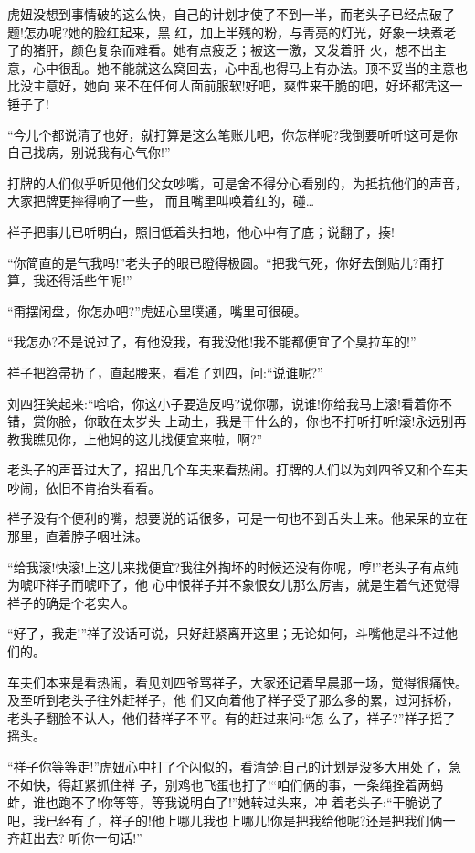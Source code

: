 \documentclass[11pt,a4paper,onecolumn]{article}
\begin{document}
虎妞没想到事情破的这么快，自己的计划才使了不到一半，而老头子已经点破了题!怎办呢?她的脸红起来，黑
红，加上半残的粉，与青亮的灯光，好象一块煮老了的猪肝，颜色复杂而难看。她有点疲乏；被这一激，又发着肝
火，想不出主意，心中很乱。她不能就这么窝回去，心中乱也得马上有办法。顶不妥当的主意也比没主意好，她向
来不在任何人面前服软!好吧，爽性来干脆的吧，好坏都凭这一锤子了!

``今儿个都说清了也好，就打算是这么笔账儿吧，你怎样呢?我倒要听听!这可是你自己找病，别说我有心气你!''

打牌的人们似乎听见他们父女吵嘴，可是舍不得分心看别的，为抵抗他们的声音，大家把牌更摔得响了一些，
而且嘴里叫唤着红的，碰\ldots 

祥子把事儿已听明白，照旧低着头扫地，他心中有了底；说翻了，揍!

``你简直的是气我吗!''老头子的眼已瞪得极圆。``把我气死，你好去倒贴儿?甭打算，我还得活些年呢!''

``甭摆闲盘，你怎办吧?''虎妞心里噗通，嘴里可很硬。

``我怎办?不是说过了，有他没我，有我没他!我不能都便宜了个臭拉车的!''

祥子把笤帚扔了，直起腰来，看准了刘四，问:``说谁呢?''

刘四狂笑起来:``哈哈，你这小子要造反吗?说你哪，说谁!你给我马上滚!看着你不错，赏你脸，你敢在太岁头
上动土，我是干什么的，你也不打听打听!滚!永远别再教我瞧见你，上他妈的这儿找便宜来啦，啊?''

老头子的声音过大了，招出几个车夫来看热闹。打牌的人们以为刘四爷又和个车夫吵闹，依旧不肯抬头看看。

祥子没有个便利的嘴，想要说的话很多，可是一句也不到舌头上来。他呆呆的立在那里，直着脖子咽吐沫。

``给我滚!快滚!上这儿来找便宜?我往外掏坏的时候还没有你呢，哼!''老头子有点纯为唬吓祥子而唬吓了，他
心中恨祥子并不象恨女儿那么厉害，就是生着气还觉得祥子的确是个老实人。

``好了，我走!''祥子没话可说，只好赶紧离开这里；无论如何，斗嘴他是斗不过他们的。

车夫们本来是看热闹，看见刘四爷骂祥子，大家还记着早晨那一场，觉得很痛快。及至听到老头子往外赶祥子，他
们又向着他了\myrule 祥子受了那么多的累，过河拆桥，老头子翻脸不认人，他们替祥子不平。有的赶过来问:``怎
么了，祥子?''祥子摇了摇头。

``祥子你等等走!''虎妞心中打了个闪似的，看清楚:自己的计划是没多大用处了，急不如快，得赶紧抓住祥
子，别鸡也飞蛋也打了!``咱们俩的事，一条绳拴着两蚂蚱，谁也跑不了!你等等，等我说明白了!''她转过头来，冲
着老头子:``干脆说了吧，我已经有了，祥子的!他上哪儿我也上哪儿!你是把我给他呢?还是把我们俩一齐赶出去?
听你一句话!''
\end{document}
